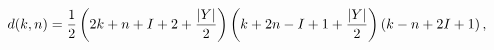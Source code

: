 \begin{equation}
d(k,n)={1\over 2}\left(2k+n+I+2+{|Y|\over 2} \right)
\left(k+2n-I+1+{|Y|\over 2} \right)\left(k-n+2I+1 \right),
\label{Yge2I}
\end{equation}

